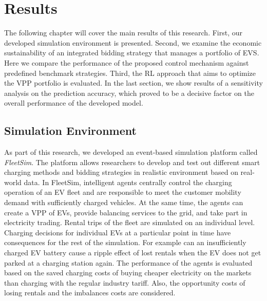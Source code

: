 \documentclass[a4paper, 12pt]{article}
\begin{document}
\clearpage

\section{Results}
\label{sec:orga41db51}
The following chapter will cover the main results of this research. First, our
developed simulation environment is presented. Second, we examine the economic
sustainability of an integrated bidding strategy that manages a portfolio of
EVS. Here we compare the performance of the proposed control mechanism against
predefined benchmark strategies. Third, the RL approach that aims to optimize
the VPP portfolio is evaluated. In the last section, we show results of a
sensitivity analysis on the prediction accuracy, which proved to be a decisive
factor on the overall performance of the developed model.

\subsection{Simulation Environment}
\label{sec:org284b650}
As part of this research, we developed an event-based simulation platform called
\emph{FleetSim}. The platform allows researchers to develop and test out different
smart charging methods and bidding strategies in realistic environment based on
real-world data. In FleetSim, intelligent agents centrally control the charging
operation of an EV fleet and are responsible to meet the customer mobility
demand with sufficiently charged vehicles. At the same time, the agents can
create a VPP of EVs, provide balancing services to the grid, and take part in
electricity trading. Rental trips of the fleet are simulated on an individual
level. Charging decisions for individual EVs at a particular point in time have
consequences for the rest of the simulation. For example can an insufficiently
charged EV battery cause a ripple effect of lost rentals when the EV does not
get parked at a charging station again. The performance of the agents is
evaluated based on the saved charging costs of buying cheaper electricity on the
markets than charging with the regular industry tariff. Also, the opportunity
costs of losing rentals and the imbalances costs are considered.
\end{document}
